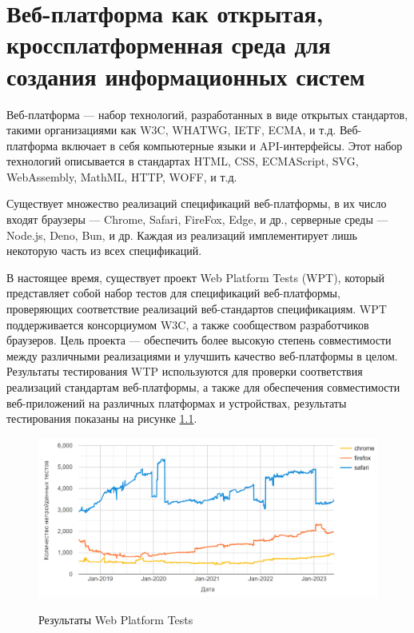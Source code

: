 \chapter{Веб-платформа как открытая, кроссплатформенная среда для создания информационных систем}

Веб-платформа — набор технологий, разработанных в виде открытых стандартов, такими организациями как W3C, WHATWG, IETF, ECMA, и т.д. Веб-платформа включает в себя компьютерные языки и API-интерфейсы. Этот набор технологий описывается в стандартах HTML, CSS, ECMAScript, SVG, WebAssembly, MathML, HTTP, WOFF, и т.д.

Существует множество реализаций спецификаций веб-платформы, в их число входят браузеры — Chrome, Safari, FireFox, Edge, и др., серверные среды — Node.js, Deno, Bun, и др. Каждая из реализаций имплементирует лишь некоторую часть из всех спецификаций.

В настоящее время, существует проект Web Platform Tests (WPT), который представляет собой набор тестов для спецификаций веб-платформы, проверяющих соответствие реализаций веб-стандартов спецификациям. WPT поддерживается консорциумом W3C, а также сообществом разработчиков браузеров. Цель проекта — обеспечить более высокую степень совместимости между различными реализациями и улучшить качество веб-платформы в целом. Результаты тестирования WTP используются для проверки соответствия реализаций стандартам веб-платформы, а также для обеспечения совместимости веб-приложений на различных платформах и устройствах, результаты тестирования показаны на рисунке \ref{fig:web-platform-tests}.

\begin{figure}[H]
\begin{center}
\includegraphics[width=1.0\hsize]{fig/web-platform-tests.png}\\[2mm]
\caption{Результаты Web Platform Tests}\label{fig:web-platform-tests}
\end{center}
\end{figure}


